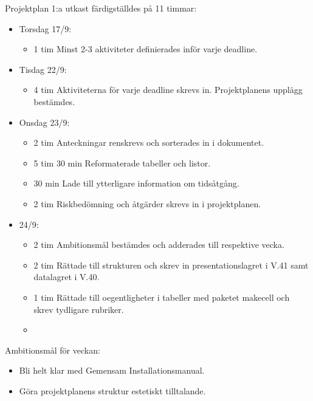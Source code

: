 \documentclass{TDP003mall}
\begin{document}
	Projektplan 1:a utkast färdigställdes på 11 timmar:
\begin{itemize}
	\item Torsdag 17/9:
	\begin{itemize}
		\item 1 tim Minst 2-3 aktiviteter definierades inför varje deadline.
	\end{itemize}
	\item Tisdag 22/9:
	\begin{itemize}
		\item 4 tim Aktiviteterna för varje deadline skrevs in. Projektplanens upplägg bestämdes.
	\end{itemize}
	\item Onsdag 23/9:
	\begin{itemize}
		\item 2 tim Anteckningar renskrevs och sorterades in i dokumentet.
		\item 5 tim 30 min Reformaterade tabeller och listor.
		\item 30 min Lade till ytterligare information om tidsåtgång.
                \item 2 tim Riskbedömning och åtgärder skrevs in i projektplanen.
	\end{itemize}
        \item 24/9:
        \begin{itemize}
        \item 2 tim Ambitionsmål bestämdes och adderades till respektive vecka.
        \item 2 tim Rättade till strukturen och skrev in presentationslagret i V.41 samt datalagret i V.40.
        \item 1 tim Rättade till oegentligheter i tabeller med paketet makecell och skrev tydligare rubriker.
          \item
	\end{itemize}
      \end{itemize}

Ambitionsmål för veckan:
\begin{itemize}
\item Bli helt klar med Gemensam Installationsmanual.
  \item Göra projektplanens struktur estetiskt tilltalande.
  \end{itemize}

\newpage
\end{document}
